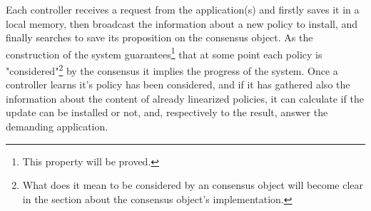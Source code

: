 \documentclass{article}
\theoremstyle{remark}
\begin{document}
Each controller receives a request from the application(s) and firstly saves it in a local memory, then broadcast the information about a new policy to install, and finally searches to save its proposition on the consensus object. As the construction of the system guarantees\footnote{This property will be proved.} that at some point each policy is "considered"\footnote{What does it mean to be considered by an consensus object will become clear in the section about the consensus object's implementation.} by the consensus it implies the progress of the system. Once a controller learns it's policy has been considered, and if it has gathered also the information about the content of already linearized policies, it can calculate if the  update can be installed  or not, and, respectively to the result, answer the demanding application.  \\
\end{document}
